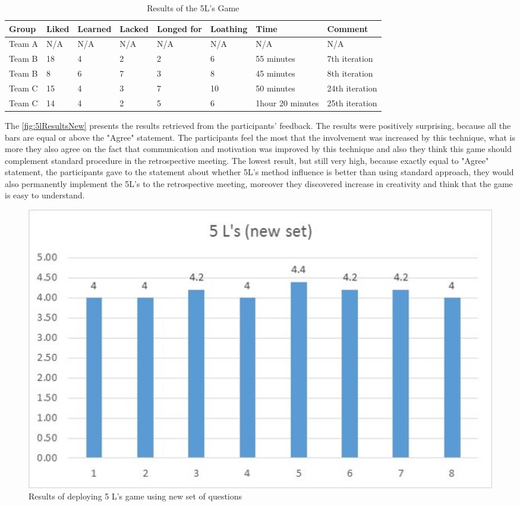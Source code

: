 \begin{table}[!htbp]
	\caption{Results of the 5L's Game}
	\label{tab:groups-5LTeamResultsN}
	\begin{tabularx}{\textwidth}{|X|X|X|X|X|X|X|X|}
	\hline
		Group & Liked & Learned & Lacked & Longed for & Loathing & Time & Comment\\ \hline
		Team A &  N/A & N/A & N/A &  N/A & N/A & N/A & N/A \\ \hline
		Team B & 18 & 4 & 2 & 2 & 6 & 55 minutes & 7th iteration\\ \hline
        Team B & 8 & 6 & 7 & 3 & 8 & 45 minutes & 8th iteration\\ \hline
        Team C & 15 & 4 & 3 & 7 & 10 & 50 minutes & 24th iteration\\ \hline
        Team C & 14 & 4 & 2 & 5 & 6 & 1hour 20 minutes & 25th iteration\\ \hline
	\end{tabularx}
\end{table}

The \autoref{fig:5lResultsNew} presents the results retrieved from the participants' feedback. The results were positively surprising, because all the bars are equal or above the "Agree" statement. The participants feel the most that the involvement was increased by this technique, what is more they also agree on the fact that communication and motivation was improved by this technique and also they think this game should complement standard procedure in the retrospective meeting. The lowest result, but still very high, because exactly equal to "Agree" statement, the participants gave to the statement about whether 5L's method influence is better than using standard approach, they would also permanently implement the 5L's to the retrospective meeting, moreover they discovered increase in creativity and think that the game is easy to understand.

\begin{figure}[!htbp]
\caption{Results of deploying 5 L's game using new set of questions}
\label{fig:5lResultsNew}
\centering
\includegraphics[width=1\textwidth]{charts/5LNewSet}
\end{figure}

